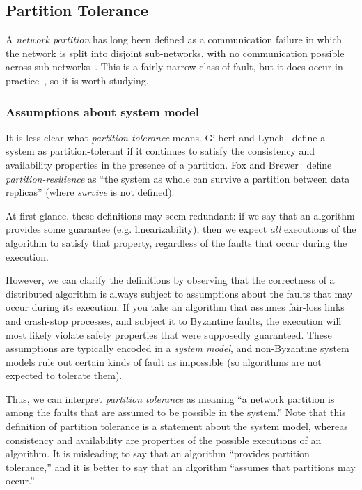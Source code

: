 \documentclass[a4paper,twocolumn,10pt]{article}
\begin{document}
\subsection{Partition Tolerance}\label{sec:partitions}

A \emph{network partition} has long been defined as a communication failure in which the network is
split into disjoint sub-networks, with no communication possible across
sub-networks~\cite{Johnson1975we}. This is a fairly narrow class of fault, but it does occur in
practice~\cite{Bailis2014jx}, so it is worth studying.

\subsubsection{Assumptions about system model}\label{sec:systemmodel}

It is less clear what \emph{partition tolerance} means. Gilbert and Lynch~\cite{Gilbert2002il}
define a system as partition-tolerant if it continues to satisfy the consistency and availability
properties in the presence of a partition. Fox and Brewer~\cite{Fox1999bs} define
\emph{partition-resilience} as ``the system as whole can survive a partition between data replicas''
(where \emph{survive} is not defined).

At first glance, these definitions may seem redundant: if we say that an algorithm provides some
guarantee (e.g. linearizability), then we expect \emph{all} executions of the algorithm to satisfy
that property, regardless of the faults that occur during the execution.

However, we can clarify the definitions by observing that the correctness of a distributed algorithm
is always subject to assumptions about the faults that may occur during its execution. If you take
an algorithm that assumes fair-loss links and crash-stop processes, and subject it to Byzantine
faults, the execution will most likely violate safety properties that were supposedly guaranteed.
These assumptions are typically encoded in a \emph{system model}, and non-Byzantine system models
rule out certain kinds of fault as impossible (so algorithms are not expected to tolerate them).

Thus, we can interpret \emph{partition tolerance} as meaning ``a network partition is among the
faults that are assumed to be possible in the system.'' Note that this definition of partition
tolerance is a statement about the system model, whereas consistency and availability are properties
of the possible executions of an algorithm. It is misleading to say that an algorithm ``provides
partition tolerance,'' and it is better to say that an algorithm ``assumes that partitions may
occur.''
\end{document}

